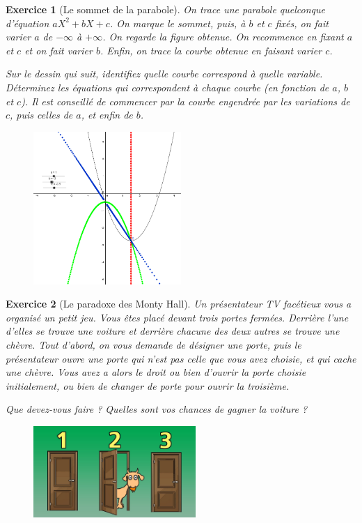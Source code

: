 \documentclass[12pt]{article}
\theoremstyle{break}
\newtheorem{exo}{Exercice}
\begin{document}
\begin{exo}[Le sommet de la parabole]
On trace une parabole quelconque d'équation $aX^2+bX+c$. On marque le sommet, puis, à $b$ et $c$ fixés, on fait varier $a$ de $-\infty$ à $+\infty$. On regarde la figure obtenue. On recommence en fixant $a$ et $c$ et on fait varier $b$. Enfin, on trace la courbe obtenue en faisant varier $c$.

Sur le dessin qui suit, identifiez quelle courbe correspond à quelle variable. Déterminez les équations qui correspondent à chaque courbe (en fonction de $a$, $b$ et $c$). Il est conseillé de commencer par la courbe engendrée par les variations de $c$, puis celles de $a$, et enfin de $b$.

\begin{figure}[h!]
	\centering
    \includegraphics[width=0.5\textwidth]{SommetParabole.png}

\end{figure}
\end{exo}


\begin{exo}[Le paradoxe des Monty Hall]
Un présentateur TV facétieux vous a organisé un petit jeu. Vous êtes placé devant trois portes fermées. Derrière l'une d'elles se trouve une voiture et derrière chacune des deux autres se trouve une chèvre. Tout d'abord, on vous demande de désigner une porte, puis le présentateur ouvre une porte qui n'est pas celle que vous avez choisie, et qui cache une chèvre. Vous avez a alors le droit ou bien d'ouvrir la porte choisie initialement, ou bien de changer de porte pour ouvrir la troisième.

Que devez-vous faire ? Quelles sont vos chances de gagner la voiture ?

\begin{figure}[!ht]
	\centering
    \includegraphics[width=0.55\textwidth]{MontyHall.jpg}

\end{figure}
\end{exo}
\end{document}
